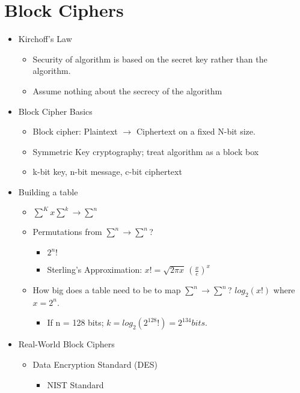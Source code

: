 \section{Block Ciphers}
\begin{itemize}
\item Kirchoff's Law
    \begin{itemize}
    \item Security of algorithm is based on the secret key rather than the algorithm.
    \item Assume nothing about the secrecy of the algorithm
    \end{itemize}
\item Block Cipher Basics
    \begin{itemize}
    \item Block cipher: Plaintext $\rightarrow$ Ciphertext on a fixed N-bit size. 
    \item Symmetric Key cryptography; treat algorithm as a block box
    \item k-bit key, n-bit message, c-bit ciphertext
    \end{itemize}
\item Building a table
    \begin{itemize}
    \item $\sum^K x \sum^k \rightarrow \sum^n$
    \item Permutations from $\sum^n \rightarrow \sum^n$?
        \begin{itemize}
        \item $2^n!$
        \item Sterling's Approximation: $x! = \sqrt{2\pi x}\,(\frac{x}{e})^x $
        \end{itemize}
    \item How big does a table need to be to map $\sum^n \rightarrow \sum^n$? $log_2(x!)$ where $x = 2^n$.
        \begin{itemize}
        \item If n = 128 bits; $k = log_2(2^{128}!) = 2^{134} bits.$
        \end{itemize}
    \end{itemize}
\item Real-World Block Ciphers
\begin{itemize}
    \item Data Encryption Standard (DES)
        \begin{itemize}
        \item NIST Standard
            \begin{itemize}

\end{itemize}
\end{itemize}
\end{itemize}
\end{itemize}
